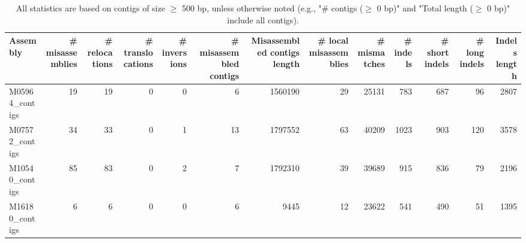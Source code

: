 \documentclass[12pt,a4paper]{article}
\begin{document}
\begin{table}[ht]
\begin{center}
\caption{All statistics are based on contigs of size $\geq$ 500 bp, unless otherwise noted (e.g., "\# contigs ($\geq$ 0 bp)" and "Total length ($\geq$ 0 bp)" include all contigs).}
\begin{tabular}{|l*{12}{|r}|}
\hline
Assembly & \# misassemblies &     \# relocations &     \# translocations &     \# inversions & \# misassembled contigs & Misassembled contigs length & \# local misassemblies & \# mismatches & \# indels &     \# short indels &     \# long indels & Indels length \\ \hline
M05964\_contigs & 19 & 19 & 0 & 0 & 6 & 1560190 & 29 & 25131 & 783 & 687 & 96 & 2807 \\ \hline
M07572\_contigs & 34 & 33 & 0 & 1 & 13 & 1797552 & 63 & 40209 & 1023 & 903 & 120 & 3578 \\ \hline
M10540\_contigs & 85 & 83 & 0 & 2 & 7 & 1792310 & 39 & 39689 & 915 & 836 & 79 & 2196 \\ \hline
M16180\_contigs & 6 & 6 & 0 & 0 & 6 & 9445 & 12 & 23622 & 541 & 490 & 51 & 1395 \\ \hline
\end{tabular}
\end{center}
\end{table}
\end{document}
